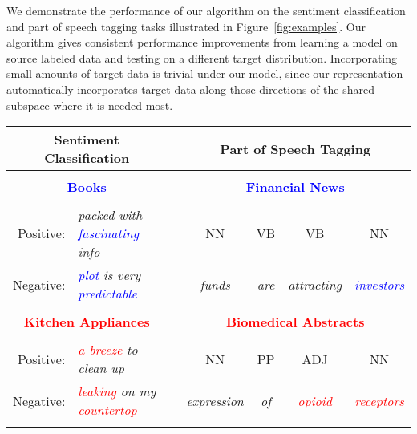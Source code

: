 We demonstrate the performance of our algorithm on the sentiment
classification and part of speech tagging tasks illustrated in
Figure~\ref{fig:examples}.  Our algorithm gives consistent performance
improvements from learning a model on source labeled data and testing
on a different target distribution.  Incorporating small amounts of
target data is trivial under our model, since our representation
automatically incorporates target data along those directions of the
shared subspace where it is needed most.

\begin{figure*}
\begin{center}
\begin{tabular}{rlccccc}
           \multicolumn{2}{c}{\large{Sentiment Classification}} & & \multicolumn{4}{c}{\large{Part of Speech Tagging}}\\
\hline 
\\
\multicolumn{2}{c}{\textbf{\textcolor{blue}{Books}}} &  \quad \quad \quad & \multicolumn{4}{c}{\textbf{\textcolor{blue}{Financial News}}} \\
\vspace{-0.1in}\\
Positive: & \emph{packed with \textcolor{blue}{fascinating} info} & & NN & VB & VB & NN\\
Negative: & \emph{\textcolor{blue}{plot} is very \textcolor{blue}{predictable}} & & \emph{funds} & \emph{are} & \emph{attracting} & \emph{\textcolor{blue}{investors}}\\
\\
\multicolumn{2}{c}{\textbf{\textcolor{red}{Kitchen Appliances}}} &  & \multicolumn{4}{c}{\textbf{\textcolor{red}{Biomedical Abstracts}}} \\
\vspace{-0.1in}\\
Positive: & {\emph{\textcolor{red}{a breeze} to clean up}} & & NN & PP & ADJ & NN\\
Negative: & \emph{\textcolor{red}{leaking} on my \textcolor{red}{countertop}} & & \emph{expression} & \emph{of} & \emph{\textcolor{red}{opioid}} & \emph{\textcolor{red}{receptors}}\\
\\
\hline
\end{tabular}
\end{center}
\label{fig:examples}
\caption{Examples from two natural language processing adaptation
  tasks, where the target distributions contain words (in red) that do
  not have support under the source distribution.  Words colored in
  blue and red are unique to the source and target domains,
  respectively.  Sentiment classification is a binary (positive
  vs. negative) classification problem.  Part of speech tagging is a
  sequence labeling task, where NN indicates noun, PP indicates
  preposition, VB indicates verb, etc.}
\end{figure*}
